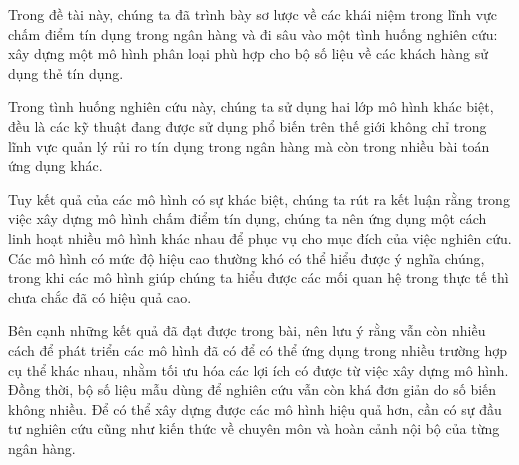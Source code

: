 

Trong đề tài này, chúng ta đã trình bày sơ lược về các khái niệm trong lĩnh vực chấm điểm tín dụng trong ngân hàng và đi sâu vào một tình huống nghiên cứu: xây dựng một mô hình phân loại phù hợp cho bộ số liệu về các khách hàng sử dụng thẻ tín dụng.

Trong tình huống nghiên cứu này, chúng ta sử dụng hai lớp mô hình khác biệt, đều là các kỹ thuật đang được sử dụng phổ biến trên thế giới không chỉ trong lĩnh vực quản lý rủi ro tín dụng trong ngân hàng mà còn trong nhiều bài toán ứng dụng khác. 

Tuy kết quả của các mô hình có sự khác biệt, chúng ta rút ra kết luận rằng trong việc xây dựng mô hình chấm điểm tín dụng, chúng ta nên ứng dụng một cách linh hoạt nhiều mô hình khác nhau để phục vụ cho mục đích của việc nghiên cứu. Các mô hình có mức độ hiệu cao thường khó có thể hiểu được ý nghĩa chúng, trong khi các mô hình giúp chúng ta hiểu được các mối quan hệ trong thực tế thì chưa chắc đã có hiệu quả cao.

Bên cạnh những kết quả đã đạt được trong bài, nên lưu ý rằng vẫn còn nhiều cách để phát triển các mô hình đã có để có thể ứng dụng trong nhiều trường hợp cụ thể khác nhau, nhằm tối ưu hóa các lợi ích có được từ việc xây dựng mô hình. Đồng thời, bộ số liệu mẫu dùng để nghiên cứu vẫn còn khá đơn giản do số biến không nhiều. Để có thể xây dựng được các mô hình hiệu quả hơn, cần có sự đầu tư nghiên cứu cũng như kiến thức về chuyên môn và hoàn cảnh nội bộ của từng ngân hàng.